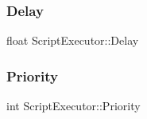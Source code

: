 \subsubsection{\texorpdfstring{Delay}{Delay}}
{\footnotesize\ttfamily float Script\+Executor\+::\+Delay}

\hypertarget{class_script_executor_a2e289ae120dd8dac6366c15eab9dd758}{}\label{class_script_executor_a2e289ae120dd8dac6366c15eab9dd758} 
\subsubsection{\texorpdfstring{Priority}{Priority}}
{\footnotesize\ttfamily int Script\+Executor\+::\+Priority}

